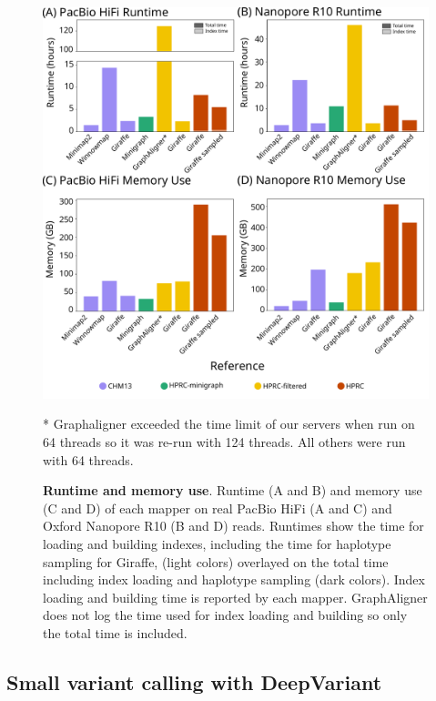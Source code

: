 \documentclass[11pt]{ucscthesis}
\begin{document}
\begin{figure}[htb]
    \centering
    \begin{threeparttable}
    \includegraphics[width=0.75\columnwidth]{lr_runtime_memory.pdf}
    \begin{tablenotes}
        \item [*] Graphaligner exceeded the time limit of our servers when run on 64 threads so it was re-run with 124 threads. All others were run with 64 threads.
    \end{tablenotes}
    \end{threeparttable}
    \caption[Long read runtime and memory use]{\textbf{Runtime and memory use}. Runtime (A and B) and memory use (C and D) of each mapper on real PacBio HiFi (A and C) and Oxford Nanopore R10 (B and D) reads. Runtimes show the time for loading and building indexes, including the time for haplotype sampling for Giraffe, (light colors) overlayed on the total time including index loading and haplotype sampling (dark colors). Index loading and building time is reported by each mapper. GraphAligner does not log the time used for index loading and building so only the total time is included.}
    \label{fig:runtime_memory}
\end{figure}

\subsection{Small variant calling with DeepVariant}
\end{document}
